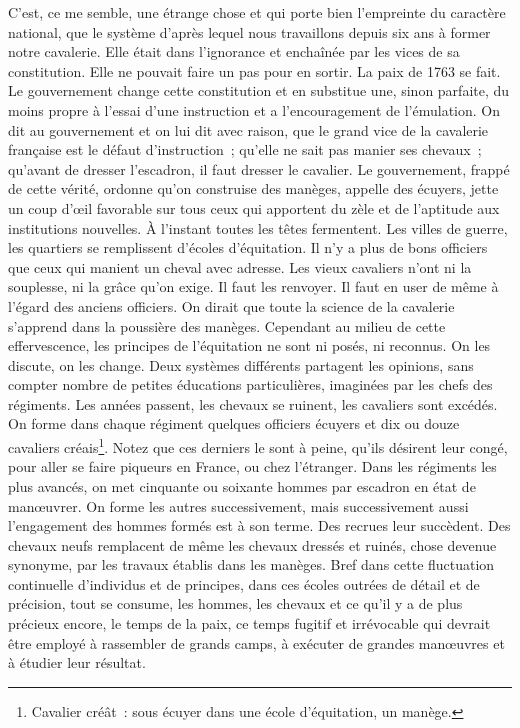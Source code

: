 \documentclass[french,twoside]{book} %
\begin{document}
C’est, ce me semble, une étrange chose et qui porte bien l’empreinte du caractère national, que le système d’après lequel nous travaillons depuis six ans à former notre cavalerie. Elle était dans l’ignorance et enchaînée par les vices de sa constitution. Elle ne pouvait faire un pas pour en sortir. La paix de 1763 se fait. Le gouvernement change cette constitution et en substitue une, sinon parfaite, du moins propre à l’essai d’une instruction et a l’encouragement de l’émulation. On dit au gouvernement et on lui dit avec raison, que le grand vice de la cavalerie française est le défaut d’instruction ; qu’elle ne sait pas manier ses chevaux ; qu’avant de dresser l’escadron, il faut dresser le cavalier. Le gouvernement, frappé de cette vérité, ordonne qu’on construise des manèges, appelle des écuyers, jette un coup d’œil favorable sur tous ceux qui apportent du zèle et de l’aptitude aux institutions nouvelles. À l’instant toutes les têtes fermentent. Les villes de guerre, les quartiers se remplissent d’écoles d’équitation. Il n’y a plus de bons officiers que ceux qui manient un cheval avec adresse. Les vieux cavaliers n’ont ni la souplesse, ni la grâce qu’on exige. Il faut les renvoyer. Il faut en user de même à l’égard des anciens officiers. On dirait que toute la science de la cavalerie s’apprend dans la poussière des manèges. Cependant au milieu de cette effervescence, les principes de l’équitation ne sont ni posés, ni reconnus. On les discute, on les change. Deux systèmes différents partagent les opinions, sans compter nombre de petites éducations particulières, imaginées par les chefs des régiments. Les années passent, les chevaux se ruinent, les cavaliers sont excédés. On forme dans chaque régiment quelques officiers écuyers et dix ou douze cavaliers créais\footnote{Cavalier créât : sous écuyer dans une école d’équitation, un manège.}. Notez que ces derniers le sont à peine, qu’ils désirent leur congé, pour aller se faire piqueurs en France, ou chez l’étranger. Dans les régiments les plus avancés, on met cinquante ou soixante hommes par escadron en état de manœuvrer. On forme les autres successivement, mais successivement aussi l’engagement des hommes formés est à son terme. Des recrues leur succèdent. Des chevaux neufs remplacent de même les chevaux dressés et ruinés, chose devenue synonyme, par les travaux établis dans les manèges. Bref dans cette fluctuation continuelle d’individus et de principes, dans ces écoles outrées de détail et de précision, tout se consume, les hommes, les chevaux et ce qu’il y a de plus précieux encore, le temps de la paix, ce temps fugitif et irrévocable qui devrait être employé à rassembler de grands camps, à exécuter de grandes manœuvres et à étudier leur résultat.\par
\end{document}
